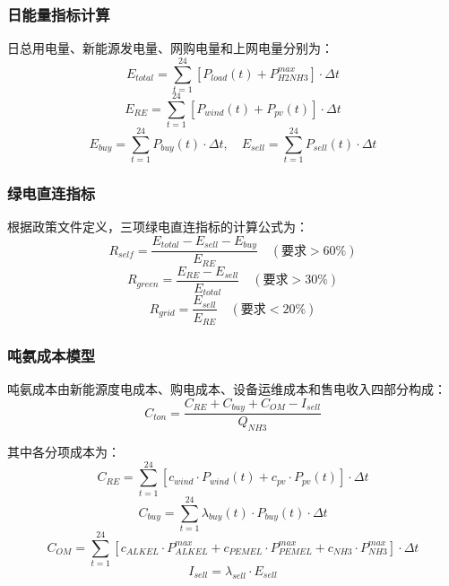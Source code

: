 \subsubsection{日能量指标计算}

日总用电量、新能源发电量、网购电量和上网电量分别为：
\begin{equation}
E_{total} = \sum_{t=1}^{24} [P_{load}(t) + P_{H2NH3}^{max}] \cdot \Delta t
\end{equation}
\begin{equation}
E_{RE} = \sum_{t=1}^{24} [P_{wind}(t) + P_{pv}(t)] \cdot \Delta t
\end{equation}
\begin{equation}
E_{buy} = \sum_{t=1}^{24} P_{buy}(t) \cdot \Delta t, \quad E_{sell} = \sum_{t=1}^{24} P_{sell}(t) \cdot \Delta t
\end{equation}

\subsubsection{绿电直连指标}

根据政策文件定义，三项绿电直连指标的计算公式为：
\begin{equation}\label{eq:R_self}
R_{self} = \frac{E_{total} - E_{sell} - E_{buy}}{E_{RE}} \quad (\text{要求} > 60\%)
\end{equation}
\begin{equation}\label{eq:R_green}
R_{green} = \frac{E_{RE} - E_{sell}}{E_{total}} \quad (\text{要求} > 30\%)
\end{equation}
\begin{equation}\label{eq:R_grid}
R_{grid} = \frac{E_{sell}}{E_{RE}} \quad (\text{要求} < 20\%)
\end{equation}

\subsubsection{吨氨成本模型}

吨氨成本由新能源度电成本、购电成本、设备运维成本和售电收入四部分构成：
\begin{equation}\label{eq:C_ton}
C_{ton} = \frac{C_{RE} + C_{buy} + C_{OM} - I_{sell}}{Q_{NH3}}
\end{equation}

其中各分项成本为：
\begin{equation}
C_{RE} = \sum_{t=1}^{24} [c_{wind} \cdot P_{wind}(t) + c_{pv} \cdot P_{pv}(t)] \cdot \Delta t
\end{equation}
\begin{equation}
C_{buy} = \sum_{t=1}^{24} \lambda_{buy}(t) \cdot P_{buy}(t) \cdot \Delta t
\end{equation}
\begin{equation}
C_{OM} = \sum_{t=1}^{24} [c_{ALKEL} \cdot P_{ALKEL}^{max} + c_{PEMEL} \cdot P_{PEMEL}^{max} + c_{NH3} \cdot P_{NH3}^{max}] \cdot \Delta t
\end{equation}
\begin{equation}
I_{sell} = \lambda_{sell} \cdot E_{sell}
\end{equation}

